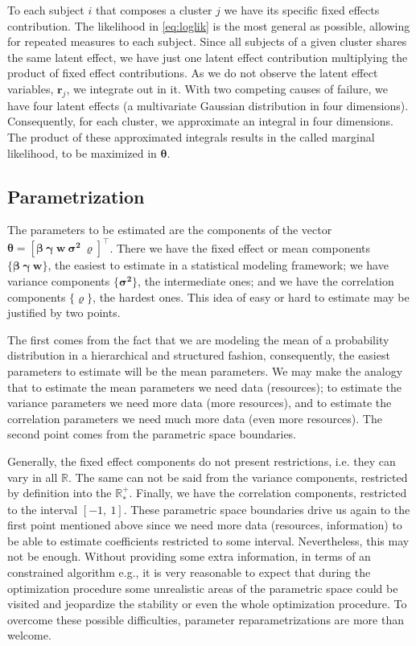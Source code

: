 To each subject \(i\) that composes a cluster \(j\) we have its specific
fixed effects contribution. The likelihood in \autoref{eq:loglik} is the
most general as possible, allowing for repeated measures to each
subject. Since all subjects of a given cluster shares the same latent
effect, we have just one latent effect contribution multiplying the
product of fixed effect contributions. As we do not observe the latent
effect variables, \(\bm{r}_{j}\), we integrate out in it. With two
competing causes of failure, we have four latent effects (a multivariate
Gaussian distribution in four dimensions). Consequently, for each
cluster, we approximate an integral in four dimensions. The product of
these approximated integrals results in the called marginal likelihood,
to be maximized in \(\bm{\theta}\).

\subsection{Parametrization}
\label{cap:parametrization}

The parameters to be estimated are the components of the vector
\(\bm{\theta} = [\bm{\beta}~\bm{\gamma}~\bm{w}~\bm{\sigma^{2}}~
\bm{\varrho}]^{\top}\). There we have the fixed effect or mean
components \(\{\bm{\beta}~\bm{\gamma}~\bm{w}\}\), the easiest to
estimate in a statistical modeling framework; we have variance
components \(\{\bm{\sigma^{2}}\}\), the intermediate ones; and we have
the correlation components \(\{\bm{\varrho}\}\), the hardest ones. This
idea of easy or hard to estimate may be justified by two points.

The first comes from the fact that we are modeling the mean of a
probability distribution in a hierarchical and structured fashion,
consequently, the easiest parameters to estimate will be the mean
parameters. We may make the analogy that to estimate the mean parameters
we need data (resources); to estimate the variance parameters we need
more data (more resources), and to estimate the correlation parameters
we need much more data (even more resources). The second point comes
from the parametric space boundaries.

Generally, the fixed effect components do not present restrictions, i.e.
they can vary in all \(\mathbb{R}\). The same can not be said from the
variance components, restricted by definition into the
\(\mathbb{R}_{\ast}^{+}\). Finally, we have the correlation components,
restricted to the interval \([-1,~1]\). These parametric space
boundaries drive us again to the first point mentioned above since we
need more data (resources, information) to be able to estimate
coefficients restricted to some interval. Nevertheless, this may not be
enough. Without providing some extra information, in terms of an
constrained algorithm e.g., it is very reasonable to expect that during
the optimization procedure some unrealistic areas of the parametric
space could be visited and jeopardize the stability or even the whole
optimization procedure. To overcome these possible difficulties,
parameter reparametrizations are more than welcome.

